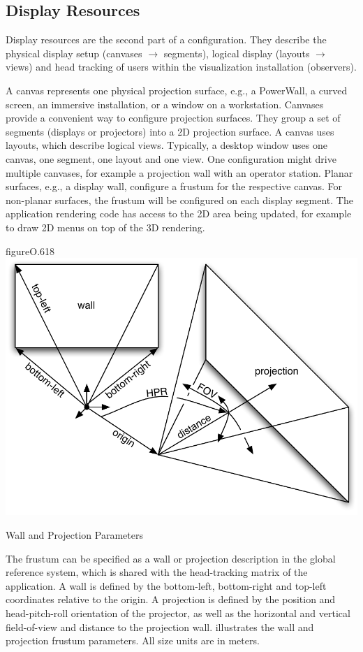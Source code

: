 \subsection{Display Resources}

Display resources are the second part of a configuration. They describe the
physical display setup (canvases $\rightarrow$ segments), logical display
(layouts $\rightarrow$ views) and head tracking of users within the
visualization installation (observers).

A \textsf{canvas} represents one physical projection surface, e.g., a
PowerWall, a curved screen, an immersive installation, or a window on a
workstation. Canvases provide a convenient way to configure projection
surfaces. They group a set of segments (displays or projectors) into a 2D
projection surface. A canvas uses layouts, which describe logical views.
Typically, a desktop window uses one canvas, one segment, one layout and one
view. One configuration might drive multiple canvases, for example a projection
wall with an operator station. Planar surfaces, e.g., a display wall, configure
a frustum for the respective canvas. For non-planar surfaces, the frustum will
be configured on each display segment. The application rendering code has
access to the 2D area being updated, for example to draw 2D menus on top of the
3D rendering.

\begin{wrapfloat}{figure}{O}{.618\textwidth}
 \includegraphics[width=.618\textwidth]{images/frusta.pdf}
 {\caption{\label{fFrusta}Wall and Projection Parameters}}
\end{wrapfloat}

The frustum can be specified as a wall or projection description in the global
reference system, which is shared with the head-tracking matrix of the
application. A wall is defined by the bottom-left, bottom-right and top-left
coordinates relative to the origin. A projection is defined by the position and
head-pitch-roll orientation of the projector, as well as the horizontal and
vertical field-of-view and distance to the projection wall. 
illustrates the wall and projection frustum parameters. All size units are in
meters.

